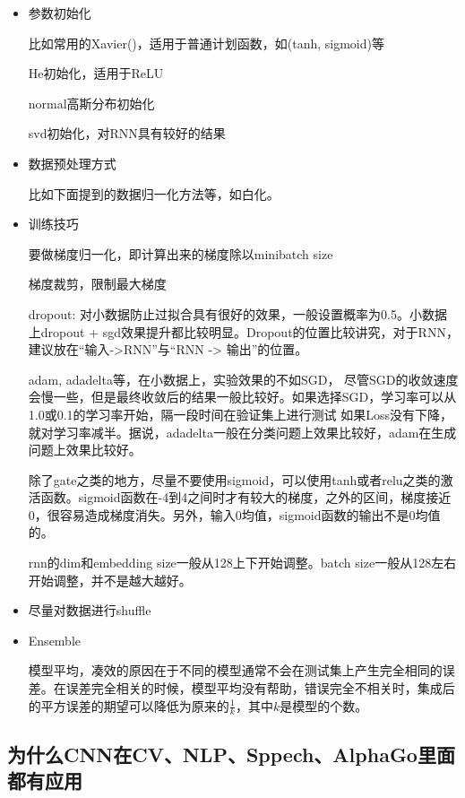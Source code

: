 \begin{itemize}
\item 参数初始化

比如常用的Xavier()，适用于普通计划函数，如(tanh, sigmoid)等

He初始化，适用于ReLU

normal高斯分布初始化

svd初始化，对RNN具有较好的结果

\item 数据预处理方式

比如下面提到的数据归一化方法等，如白化。

\item 训练技巧

要做梯度归一化，即计算出来的梯度除以minibatch size

梯度裁剪，限制最大梯度

dropout: 对小数据防止过拟合具有很好的效果，一般设置概率为0.5。小数据上dropout + sgd效果提升都比较明显。Dropout的位置比较讲究，对于RNN，建议放在“输入->RNN”与“RNN -> 输出”的位置。

adam, adadelta等，在小数据上，实验效果的不如SGD， 尽管SGD的收敛速度会慢一些，但是最终收敛后的结果一般比较好。如果选择SGD，学习率可以从1.0或0.1的学习率开始，隔一段时间在验证集上进行测试
如果Loss没有下降，就对学习率减半。据说，adadelta一般在分类问题上效果比较好，adam在生成问题上效果比较好。

除了gate之类的地方，尽量不要使用sigmoid，可以使用tanh或者relu之类的激活函数。sigmoid函数在-4到4之间时才有较大的梯度，之外的区间，梯度接近0，很容易造成梯度消失。另外，输入0均值，sigmoid函数的输出不是0均值的。

rnn的dim和embedding size一般从128上下开始调整。batch size一般从128左右开始调整，并不是越大越好。

\item 尽量对数据进行shuffle

\item Ensemble

模型平均，凑效的原因在于不同的模型通常不会在测试集上产生完全相同的误差。在误差完全相关的时候，模型平均没有帮助，错误完全不相关时，集成后的平方误差的期望可以降低为原来的$\frac{1}{k}$，其中$k$是模型的个数。

\end{itemize}

\subsection{为什么CNN在CV、NLP、Sppech、AlphaGo里面都有应用}

